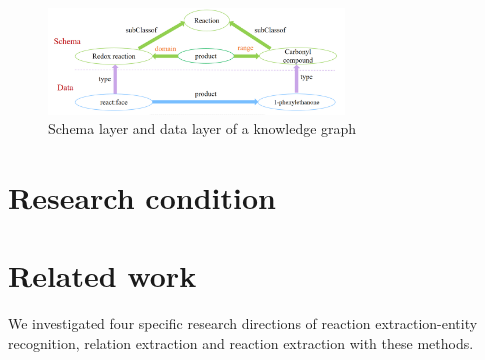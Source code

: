 \documentclass[%
 aip,
 jmp,%
 amsmath,amssymb,
 reprint,%
]{revtex4-2}
\begin{document}
\begin{figure}[htbp]
 \centering
 \includegraphics[width=0.7\textwidth]{figure/3.png}
 \caption{ Schema layer and data layer of a knowledge graph }
 \label{ Fig.3 }
\end{figure}

\section{Research condition}




\section{Related work}
We investigated four specific research directions of reaction extraction-entity recognition, relation extraction
and reaction extraction with these methods.
\end{document}
